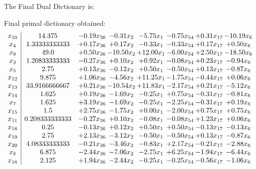 \documentclass[8pt]{article}
\begin{document}
The Final Dual Dictionary is: 

 Final primal dictionary obtained: 
\[\begin{array}{c| c c@{\hskip 2pt} c@{\hskip 2pt} c@{\hskip 2pt} c@{\hskip 2pt} c@{\hskip 2pt} c@{\hskip 2pt} }
 x_{10}   &  14.375 & -0.19 x_{36} & -0.31 x_{2} & -5.75 x_{1} & -0.75 x_{54} & +  0.31 x_{17} & -10.19 x_{6}\\
 x_{4}   &  1.33333333333 & +  0.17 x_{36} & +  0.17 x_{2} & -0.33 x_{1} & -0.33 x_{54} & +  0.17 x_{17} & +  0.50 x_{6}\\
 x_{9}   &  49.0 & +  0.50 x_{36} & -10.50 x_{2} & + 12.00 x_{1} & -6.00 x_{54} & +  2.50 x_{17} & -18.50 x_{6}\\
 x_{3}   &  1.20833333333 & -0.27 x_{36} & +  0.10 x_{2} & +  0.92 x_{1} & -0.08 x_{54} & +  0.23 x_{17} & -0.94 x_{6}\\
 x_{5}   &  2.75 & +  0.13 x_{36} & -0.12 x_{2} & +  0.50 x_{1} & -0.50 x_{54} & +  0.13 x_{17} & -0.87 x_{6}\\
 x_{12}   &  9.875 & +  1.06 x_{36} & -4.56 x_{2} & + 11.25 x_{1} & -1.75 x_{54} & -0.44 x_{17} & +  0.06 x_{6}\\
 x_{13}   &  33.9166666667 & +  0.21 x_{36} & -10.54 x_{2} & + 11.83 x_{1} & -2.17 x_{54} & +  0.21 x_{17} & -5.12 x_{6}\\
 x_{14}   &  1.625 & +  0.19 x_{36} & -1.69 x_{2} & -0.25 x_{1} & +  0.75 x_{54} & -0.31 x_{17} & -0.81 x_{6}\\
 x_{7}   &  1.625 & +  3.19 x_{36} & -1.69 x_{2} & -0.25 x_{1} & -2.25 x_{54} & -0.31 x_{17} & +  0.19 x_{6}\\
 x_{15}   &  1.5 & +  2.75 x_{36} & -1.75 x_{2} & +  0.00 x_{1} & -2.00 x_{54} & +  0.75 x_{17} & +  0.75 x_{6}\\
 x_{11}   &  0.208333333333 & -0.27 x_{36} & +  0.10 x_{2} & -0.08 x_{1} & -0.08 x_{54} & +  1.23 x_{17} & +  0.06 x_{6}\\
 x_{18}   &  0.25 & -0.13 x_{36} & +  0.12 x_{2} & +  0.50 x_{1} & +  0.50 x_{54} & -0.13 x_{17} & -0.13 x_{6}\\
 x_{19}   &  2.75 & +  2.13 x_{36} & -3.12 x_{2} & -0.50 x_{1} & -0.50 x_{54} & +  0.13 x_{17} & -0.87 x_{6}\\
 x_{20}   &  4.08333333333 & -0.21 x_{36} & -3.46 x_{2} & -0.83 x_{1} & +  2.17 x_{54} & -0.21 x_{17} & -2.88 x_{6}\\
 x_{8}   &  6.875 & -2.44 x_{36} & -7.06 x_{2} & -2.75 x_{1} & +  6.25 x_{54} & -1.94 x_{17} & -6.44 x_{6}\\
 x_{16}   &  2.125 & +  1.94 x_{36} & -2.44 x_{2} & -0.25 x_{1} & -0.25 x_{54} & -0.56 x_{17} & -1.06 x_{6}\\

\end{array}\]
\end{document}
